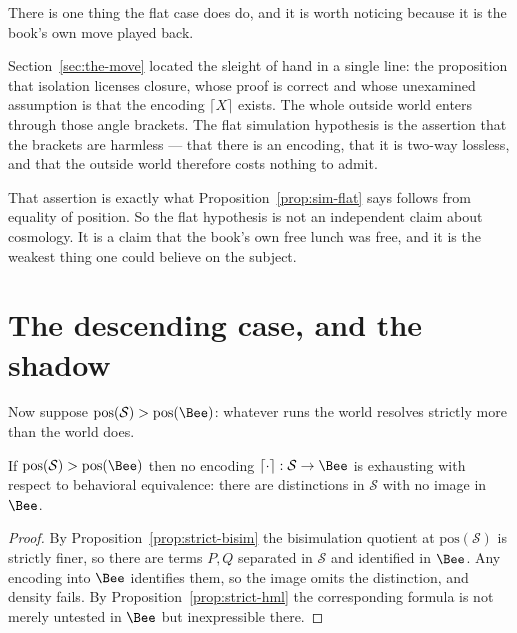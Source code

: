 \begin{remark}
\label{rmk:sim-brackets}
There is one thing the flat case does do, and it is worth noticing
because it is the book's own move played back.

Section~\ref{sec:the-move} located the sleight of hand in a single line:
the proposition that isolation licenses closure, whose proof is correct
and whose unexamined assumption is that the encoding $\lceil X \rceil$
exists.
The whole outside world enters through those angle brackets.
The flat simulation hypothesis is the assertion that the brackets are
harmless --- that there is an encoding, that it is two-way lossless, and
that the outside world therefore costs nothing to admit.

That assertion is exactly what Proposition~\ref{prop:sim-flat} says
follows from equality of position.
So the flat hypothesis is not an independent claim about cosmology.
It is a claim that the book's own free lunch was free, and it is the
weakest thing one could believe on the subject.
\end{remark}

\section{The descending case, and the shadow}
\label{sec:sim-descend}

Now suppose $\mathrm{pos}(\mathcal{S}) > \mathrm{pos}(\Bee)$: whatever
runs the world resolves strictly more than the world does.

\begin{proposition}
\label{prop:sim-shadow}
If $\mathrm{pos}(\mathcal{S}) > \mathrm{pos}(\Bee)$ then no encoding
$\lceil\cdot\rceil : \mathcal{S} \to \Bee$ is exhausting with respect to
behavioral equivalence: there are distinctions in $\mathcal{S}$ with no
image in $\Bee$.
\end{proposition}

\begin{proof}
By Proposition~\ref{prop:strict-bisim} the bisimulation quotient at
$\mathrm{pos}(\mathcal{S})$ is strictly finer, so there are terms $P, Q$
separated in $\mathcal{S}$ and identified in $\Bee$.
Any encoding into $\Bee$ identifies them, so the image omits the
distinction, and density fails.
By Proposition~\ref{prop:strict-hml} the corresponding formula is not
merely untested in $\Bee$ but inexpressible there.
\end{proof}

